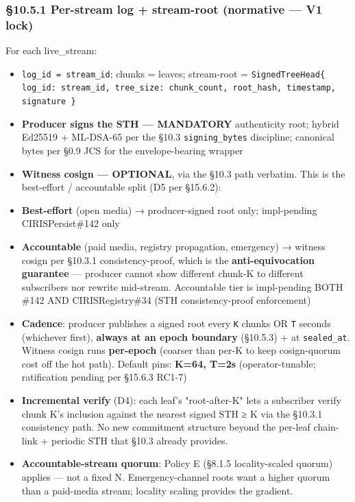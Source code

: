 \documentclass[10pt]{article}
\begin{document}
\subsubsection*{§10.5.1 Per-stream log + stream-root (normative — V1 lock)}


For each live\_stream:


\begin{itemize}\setlength\itemsep{0pt}
\item \texttt{log\_id = stream\_id}; chunks = leaves; stream-root = \texttt{SignedTreeHead\{ log\_id: stream\_id, tree\_size: chunk\_count, root\_hash, timestamp, signature \}}
\item \textbf{Producer signs the STH — MANDATORY} authenticity root; hybrid Ed25519 + ML-DSA-65 per the §10.3 \texttt{signing\_bytes} discipline; canonical bytes per §0.9 JCS for the envelope-bearing wrapper
\item \textbf{Witness cosign — OPTIONAL}, via the §10.3 path verbatim. This is the best-effort / accountable split (D5 per §15.6.2):
\item \textbf{Best-effort} (open media) → producer-signed root only; impl-pending CIRISPersist\#142 only
\item \textbf{Accountable} (paid media, registry propagation, emergency) → witness cosign per §10.3.1 consistency-proof, which is the \textbf{anti-equivocation guarantee} — producer cannot show different chunk-K to different subscribers nor rewrite mid-stream. Accountable tier is impl-pending BOTH \#142 AND CIRISRegistry\#34 (STH consistency-proof enforcement)
\item \textbf{Cadence}: producer publishes a signed root every \texttt{K} chunks OR \texttt{T} seconds (whichever first), \textbf{always at an epoch boundary} (§10.5.3) + at \texttt{sealed\_at}. Witness cosign runs \textbf{per-epoch} (coarser than per-K to keep cosign-quorum cost off the hot path). Default pins: \textbf{K=64, T=2s} (operator-tunable; ratification pending per §15.6.3 RC1-7)
\item \textbf{Incremental verify} (D4): each leaf's "root-after-K" lets a subscriber verify chunk K's inclusion against the nearest signed STH ≥ K via the §10.3.1 consistency path. No new commitment structure beyond the per-leaf chain-link + periodic STH that §10.3 already provides.
\item \textbf{Accountable-stream quorum}: Policy E (§8.1.5 locality-scaled quorum) applies — not a fixed N. Emergency-channel roots want a higher quorum than a paid-media stream; locality scaling provides the gradient.
\end{itemize}
\end{document}
